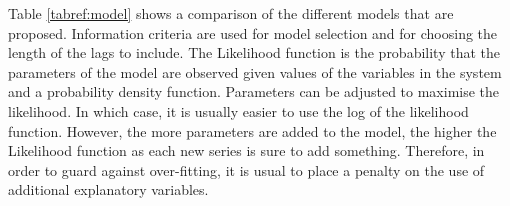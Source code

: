 \documentclass[12pt, a4paper, oneside]{article}\usepackage[]{graphicx}\usepackage[]{color}
\begin{document}
Table \ref{tabref:model} shows a comparison of the different models that are proposed.  
Information criteria are used for model selection and for choosing the length of the lags to include.  The Likelihood function is the probability that the parameters of the model are observed given values of the variables in the system and a probability density function.  Parameters can be adjusted to maximise the likelihood.  In which case, it is usually easier to use the log of the likelihood function.  However, the more parameters are added to the model, the higher the Likelihood function as each new series is sure to add something.  Therefore, in order to guard against over-fitting, it is usual to place a penalty on the use of additional explanatory variables. 



\end{document}
